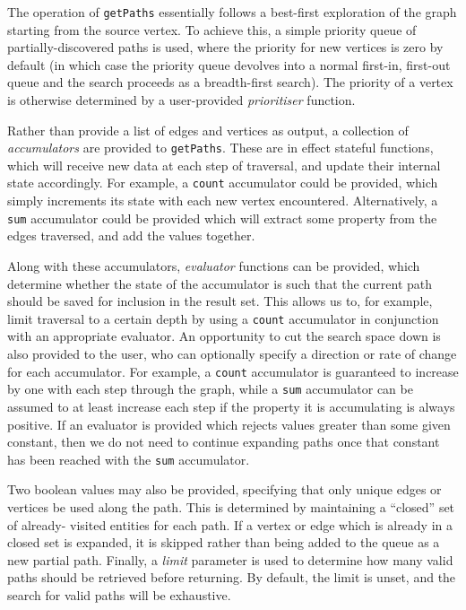 The operation of \texttt{getPaths} essentially follows a best-first
exploration of the graph starting from the source vertex. To achieve this, a
simple priority queue of partially-discovered paths is used, where the
priority for new vertices is zero by default (in which case the priority queue
devolves into a normal first-in, first-out queue and the search proceeds as a
breadth-first search). The priority of a vertex is otherwise determined by a
user-provided \textit{prioritiser} function.

Rather than provide a list of edges and vertices as output, a collection of
\textit{accumulators} are provided to \texttt{getPaths}. These are in effect
stateful functions, which  will receive new data at each step of traversal,
and update their internal state accordingly. For example, a \texttt{count}
accumulator could be provided, which simply increments its state with each new
vertex encountered. Alternatively, a \texttt{sum} accumulator could be
provided which will extract some property from the edges traversed, and add
the values together.

Along with these accumulators, \textit{evaluator} functions can be provided,
which determine whether the state of the accumulator is such that the current
path should be saved for inclusion in the result set. This allows us to, for
example, limit traversal to a certain depth by using a \texttt{count}
accumulator in conjunction with an appropriate evaluator. An opportunity to
cut the search space down is also provided to the user, who can optionally
specify  a direction or rate of change for each accumulator. For example, a
\texttt{count} accumulator is guaranteed to increase by one with each step
through the graph, while a \texttt{sum} accumulator can be assumed to at least
increase each step if the property it is accumulating is always positive. If
an evaluator is provided which rejects values greater than some given
constant, then we do not need to continue expanding paths once that constant
has been reached with the \texttt{sum} accumulator. 

Two boolean values may also be provided, specifying that only unique edges or
vertices be used along the path. This is determined by maintaining a
``closed'' set of already- visited entities for each path. If a vertex or edge
which is already in a closed set is expanded, it is skipped rather than being
added to the queue as a new partial path.  Finally, a \textit{limit} parameter
is used to determine how many valid paths should be retrieved before
returning. By default, the limit is unset, and the search for valid paths will
be exhaustive.

